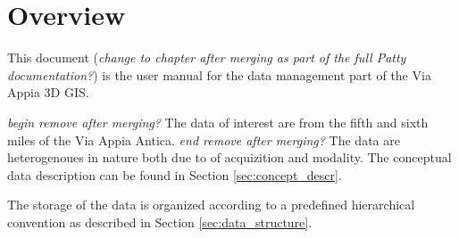 \section{Overview}
\label{sec:dataman_overview}

This document ({\em change to chapter after merging as part of the full Patty documentation?}) is the user manual for the data management part of the Via Appia 3D GIS.

{\em begin remove after merging?} The data of interest are from the fifth and sixth miles of the Via Appia Antica. {\em end remove after merging?} The data are heterogenoues in nature both due to of acquizition and modality. The conceptual data description can be found in Section \ref{sec:concept_descr}. 

The storage of the data is organized according to a predefined hierarchical convention as described in Section \ref{sec:data_structure}.